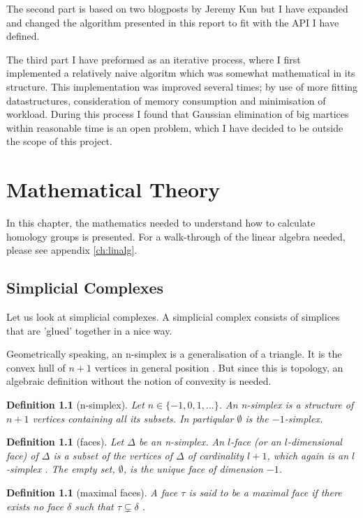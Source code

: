 \documentclass[11pt,a4paper,twoside, openright]{report}
\newtheorem{mydef}[mythm]{Definition}
\begin{document}
The second part is based on two blogposts by Jeremy Kun \cite{KunPrimer}\cite{Kun} but I have expanded and changed the algorithm presented in this report to fit with the API I have defined.

The third part I have preformed as an iterative process, where I first implemented a relatively naive algoritm which was somewhat mathematical in its structure. This implementation was improved several times; by use of more fitting datastructures, consideration of memory consumption and minimisation of workload. During this process I found that Gaussian elimination of big martices within reasonable time is an open problem, which I have decided to be outside the scope of this project.

\chapter{Mathematical Theory} \label{ch:theory}
In this chapter, the mathematics needed to understand how to calculate homology groups is presented. For a walk-through of the linear algebra needed, please see appendix \ref{ch:linalg}.

\section{Simplicial Complexes}
Let us look at simplicial complexes. A simplicial complex consists of simplices that are 'glued' together in a nice way.

Geometrically speaking, an n-simplex is a generalisation of a triangle. It is the convex hull of $n+1$ vertices in general position \cite{Nadathur}. But since this is topology, an algebraic definition without the notion of convexity is needed.

\begin{mydef}[n-simplex]
Let $n\in\{-1,0,1,\dots\}$. An n-simplex is a structure of $n+1$ vertices containing all its subsets. In partiqular $\emptyset$ is the $-1$-simplex.
\end{mydef}

\begin{mydef}[faces]
Let $\Delta$ be an n-simplex. An $l$-face (or an $l$-dimensional face) of $\Delta$ is a subset of the vertices of $\Delta$ of cardinality $l+1$, which again is an $l$-simplex \cite{Nadathur}. The empty set, $\emptyset$, is the unique face of dimension $-1$\cite{Allgaier}.
\end{mydef}

\begin{mydef}[maximal faces]
A face $\tau$ is said to be a maximal face if there exists no face $\delta$ such that $\tau \subsetneq \delta$ \cite[p.15]{Jonsson}.
\end{mydef}
\end{document}
